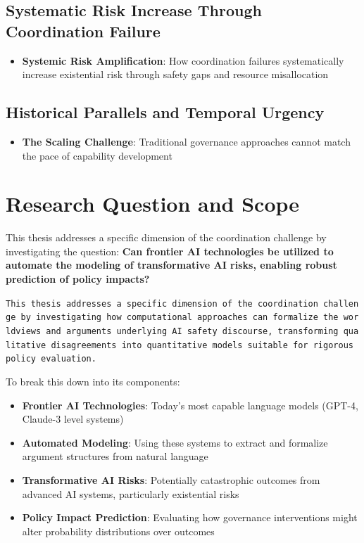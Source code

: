 \documentclass[
  11pt,
  letterpaper,
]{book}
\providecommand{\tightlist}{%
  \setlength{\itemsep}{0pt}\setlength{\parskip}{0pt}}
\begin{document}
\subsection{Systematic Risk Increase Through Coordination
Failure}\label{sec-risk-increase}

\begin{itemize}
\tightlist
\item
  \textbf{Systemic Risk Amplification}: How coordination failures
  systematically increase existential risk through safety gaps and
  resource misallocation
\end{itemize}

\subsection{Historical Parallels and Temporal
Urgency}\label{sec-historical-parallels}

\begin{itemize}
\tightlist
\item
  \textbf{The Scaling Challenge}: Traditional governance approaches
  cannot match the pace of capability development
\end{itemize}

\section{Research Question and Scope}\label{sec-research-question}

This thesis addresses a specific dimension of the coordination challenge
by investigating the question: \textbf{Can frontier AI technologies be
utilized to automate the modeling of transformative AI risks, enabling
robust prediction of policy impacts?}

\texttt{This\ thesis\ addresses\ a\ specific\ dimension\ of\ the\ coordination\ challenge\ by\ investigating\ how\ computational\ approaches\ can\ formalize\ the\ worldviews\ and\ arguments\ underlying\ AI\ safety\ discourse,\ transforming\ qualitative\ disagreements\ into\ quantitative\ models\ suitable\ for\ rigorous\ policy\ evaluation.}

To break this down into its components:

\begin{itemize}
\tightlist
\item
  \textbf{Frontier AI Technologies}: Today's most capable language
  models (GPT-4, Claude-3 level systems)
\item
  \textbf{Automated Modeling}: Using these systems to extract and
  formalize argument structures from natural language
\item
  \textbf{Transformative AI Risks}: Potentially catastrophic outcomes
  from advanced AI systems, particularly existential risks
\item
  \textbf{Policy Impact Prediction}: Evaluating how governance
  interventions might alter probability distributions over outcomes
\end{itemize}
\end{document}
